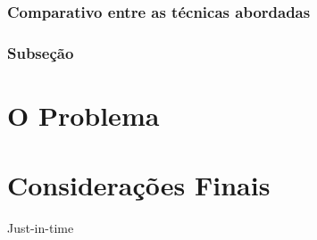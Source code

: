 \documentclass[12pt,
				openright,
				twoside,
				a4paper,
				apter=TITLE,
				section=TITLE,
				subsection=TITLE,
				chapter=TITLE,
				english,
				french,
				spanish,
				brazil]{abntex2}
\begin{document}
\subsection{Comparativo entre as técnicas abordadas}



\subsection{Subseção}


\chapter{O Problema}
\chapter{Considerações Finais}
Just-in-time



\end{document}
